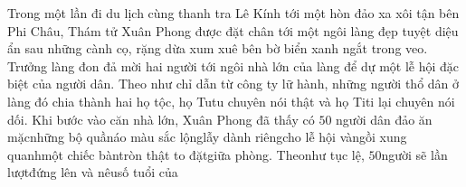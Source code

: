 \begin{multicols}{2}
	 Trong một lần đi du lịch cùng thanh tra Lê Kính tới một hòn đảo xa xôi tận bên Phi Châu, Thám tử Xuân Phong được đặt chân tới một ngôi làng đẹp tuyệt diệu ẩn sau những cành cọ, rặng dừa xum xuê bên bờ biển xanh ngắt trong veo. Trưởng làng đon đả mời hai người tới ngôi nhà lớn của làng để dự một lễ hội đặc biệt của người dân. Theo như chỉ dẫn từ công ty lữ hành, những người thổ dân ở làng đó chia thành hai họ tộc, họ Tutu chuyên nói thật và họ Titi lại chuyên nói dối. Khi bước vào căn nhà lớn, Xuân Phong đã thấy có $50$ người dân đảo ăn mặc\hspace*{123pt}\linebreak[6]những bộ quần\hspace*{123pt}\linebreak[6]áo màu sắc lộng\hspace*{123pt}\linebreak[6]lẫy dành riêng\hspace*{123pt}\linebreak[6]cho lễ hội và\hspace*{123pt}\linebreak[6]ngồi xung quanh\hspace*{123pt}\linebreak[6]một chiếc bàn\hspace*{123pt}\linebreak[6]tròn thật to đặt\hspace*{123pt}\linebreak[6]giữa phòng. Theo\hspace*{123pt}\linebreak[6]như tục lệ, $50$\hspace*{123pt}\linebreak[6]người sẽ lần lượt\hspace*{123pt}\linebreak[6]đứng lên và nêu\hspace*{123pt}\linebreak[6]số tuổi của 
\end{multicols}
